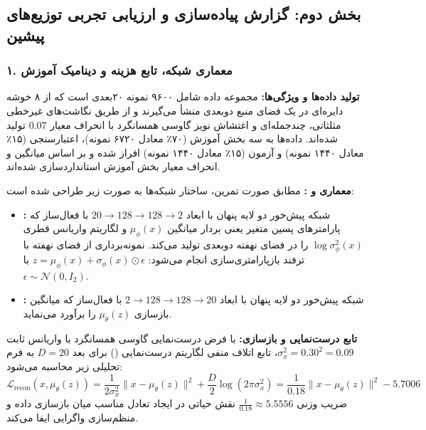 \subsection{بخش دوم: گزارش پیاده‌سازی و ارزیابی تجربی توزیع‌های پیشین}
\label{sec:q2-experimental}

\subsubsection{۱. معماری شبکه، تابع هزینه و دینامیک آموزش}
\label{sec:q2-arch}

\textbf{تولید داده‌ها و ویژگی‌ها:} مجموعه داده شامل ۹۶۰۰ نمونه ۲۰‌بعدی است که از ۸ خوشه دایره‌ای در یک فضای منبع دوبعدی منشأ می‌گیرند و از طریق نگاشت‌های غیرخطی مثلثاتی، چندجمله‌ای و اغتشاش نویز گاوسی همسانگرد با انحراف معیار $0.07$ تولید شده‌اند. داده‌ها به سه بخش آموزش (۷۰٪ معادل ۶۷۲۰ نمونه)، اعتبارسنجی (۱۵٪ معادل ۱۴۴۰ نمونه) و آزمون (۱۵٪ معادل ۱۴۴۰ نمونه) افراز شده و بر اساس میانگین و انحراف معیار بخش آموزش استانداردسازی شده‌اند.

\textbf{معماری  و :} مطابق صورت تمرین، ساختار شبکه‌ها به صورت زیر طراحی شده است:
\begin{itemize}
  \item \textbf{:} شبکه پیش‌خور دو لایه پنهان با ابعاد $20 \to 128 \to 128 \to 2$ با فعال‌ساز  که پارامترهای پسین متغیر یعنی بردار میانگین $\mu_\phi(x)$ و لگاریتم واریانس قطری $\log\sigma_\phi^2(x)$ را در فضای نهفته دوبعدی تولید می‌کند. نمونه‌برداری از فضای نهفته با ترفند بازپارامتری‌سازی انجام می‌شود: $z = \mu_\phi(x) + \sigma_\phi(x) \odot \epsilon$ با $\epsilon \sim \mathcal{N}(0, I_2)$.
  \item \textbf{:} شبکه پیش‌خور دو لایه پنهان با ابعاد $2 \to 128 \to 128 \to 20$ با فعال‌ساز  که میانگین بازسازی $\mu_\theta(z)$ را برآورد می‌نماید.
\end{itemize}

\textbf{تابع درست‌نمایی و بازسازی:} با فرض درست‌نمایی گاوسی همسانگرد با واریانس ثابت $\sigma_x^2 = 0.30^2 = 0.09$، تابع اتلاف منفی لگاریتم درست‌نمایی () برای بعد $D=20$ به فرم تحلیلی زیر محاسبه می‌شود:
\begin{equation}
  \mathcal{L}_{\text{recon}}(x, \mu_\theta(z)) = \frac{1}{2\sigma_x^2} \|x - \mu_\theta(z)\|^2 + \frac{D}{2}\log(2\pi\sigma_x^2) = \frac{1}{0.18} \|x - \mu_\theta(z)\|^2 - 5.7006
  \label{eq:recon-nll}
\end{equation}
ضریب وزنی $\frac{1}{0.18} \approx 5.5556$ نقش حیاتی در ایجاد تعادل مناسب میان بازسازی داده و منظم‌سازی واگرایی  ایفا می‌کند.

